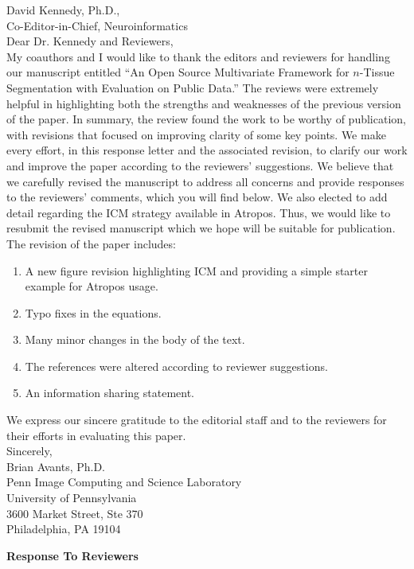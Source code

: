 \documentclass[11pt]{article}
\begin{document}
\noindent
David Kennedy, Ph.D.,\\
Co-Editor-in-Chief, Neuroinformatics\\

\noindent
Dear Dr. Kennedy and Reviewers,\\

\noindent
My coauthors and I would like to thank the editors and reviewers for
handling our manuscript entitled ``An Open Source Multivariate Framework for $n$-Tissue
  Segmentation with Evaluation on Public Data.''  The reviews were extremely helpful in highlighting both
the strengths and weaknesses of the previous version of the paper.  In
summary, the review found the work to be worthy of publication, with
revisions that focused on improving clarity of some key points. We make every effort, in this response letter and the
associated revision, to clarify our work and improve the paper
according to the reviewers' suggestions. We believe that we carefully
revised the manuscript to address all concerns and provide responses
to the reviewers' comments, which you will find below.   We
also elected to add detail regarding the ICM strategy
available in Atropos. Thus, we would
like to resubmit the revised manuscript which we hope will be suitable
for publication. \\

\noindent
The revision of the paper includes:
\begin{enumerate}
\item  A new figure revision highlighting ICM and providing a simple
  starter example for Atropos usage. 
\item Typo fixes in the equations. 
\item  Many minor changes in the body of the text.  
\item  The references were altered according to reviewer suggestions.
\item  An information sharing statement. 
\end{enumerate}
We express our sincere gratitude to
the editorial staff and to the reviewers for their efforts in
evaluating this paper. \\

\noindent
Sincerely,\\

\noindent
Brian Avants, Ph.D.\\
Penn Image Computing and Science Laboratory \\ 
University of Pennsylvania\\
3600 Market Street, Ste 370\\
Philadelphia, PA 19104
\newpage
\begin{center}
\LARGE{{\bf Response To Reviewers}}
\end{center}
\end{document}
